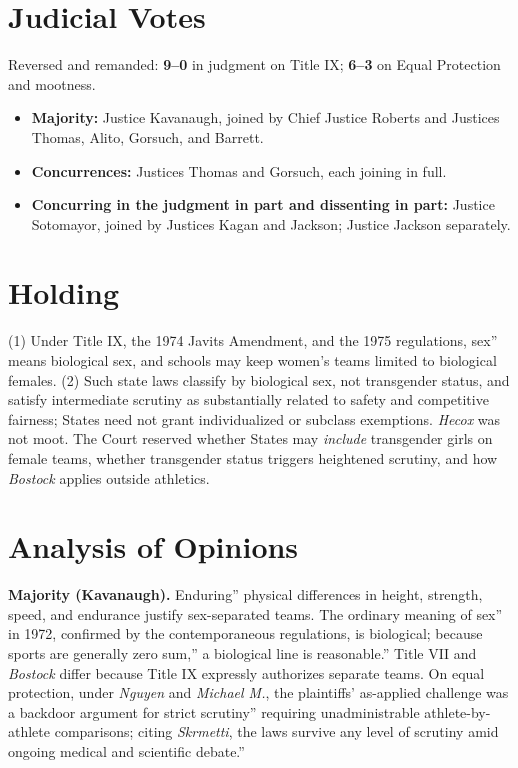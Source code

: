 \documentclass[12pt]{article}
\begin{document}
\section{Judicial Votes}

Reversed and remanded: \textbf{9--0} in judgment on Title IX; \textbf{6--3} on Equal Protection and mootness.
\begin{itemize}
\item \textbf{Majority:} Justice Kavanaugh, joined by Chief Justice Roberts and Justices Thomas, Alito, Gorsuch, and Barrett.
\item \textbf{Concurrences:} Justices Thomas and Gorsuch, each joining in full.
\item \textbf{Concurring in the judgment in part and dissenting in part:} Justice Sotomayor, joined by Justices Kagan and Jackson; Justice Jackson separately.
\end{itemize}

\section{Holding}

(1) Under Title IX, the 1974 Javits Amendment, and the 1975 regulations, sex'' means biological sex, and schools may keep women's teams limited to biological females. (2) Such state laws classify by biological sex, not transgender status, and satisfy intermediate scrutiny as substantially related to safety and competitive fairness; States need not grant individualized or subclass exemptions. \textit{Hecox} was not moot. The Court reserved whether States may \textit{include} transgender girls on female teams, whether transgender status triggers heightened scrutiny, and how \textit{Bostock} applies outside athletics.

\section{Analysis of Opinions}

\textbf{Majority (Kavanaugh).} Enduring'' physical differences in height, strength, speed, and endurance justify sex-separated teams. The ordinary meaning of sex'' in 1972, confirmed by the contemporaneous regulations, is biological; because sports are generally zero sum,'' a biological line is reasonable.'' Title VII and \textit{Bostock} differ because Title IX expressly authorizes separate teams. On equal protection, under \textit{Nguyen} and \textit{Michael M.}, the plaintiffs' as-applied challenge was a backdoor argument for strict scrutiny'' requiring unadministrable athlete-by-athlete comparisons; citing \textit{Skrmetti}, the laws survive any level of scrutiny amid ongoing medical and scientific debate.''
\end{document}
